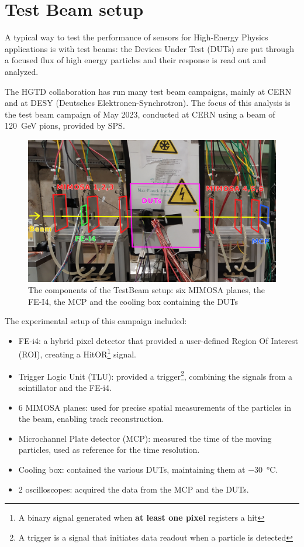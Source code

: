 \chapter{Test Beam setup}

A typical way to test the performance of sensors for High-Energy Physics applications is with test beams: the Devices Under Test (DUTs) are put through a focused flux of high energy particles and their response is read out and analyzed. %

The HGTD collaboration has run many test beam campaigns, mainly at CERN and at DESY (Deutsches Elektronen-Synchrotron). The focus of this analysis is the test beam campaign of May 2023, conducted at CERN using a beam of \qty{120}{\giga\electronvolt} pions, provided by SPS.

\begin{figure}[!ht]
    \centering
    \includegraphics[width=.95\linewidth]{Images/TestBeam_setup/TestBeam_setup_redrawn.png}
    \captionsetup{width=.8\linewidth}
    \caption{The components of the TestBeam setup: six MIMOSA planes, the FE-I4, the MCP and the cooling box containing the DUTs}
    \label{fig:testbeam_setup}
\end{figure}

The experimental setup of this campaign included:
\begin{itemize}
    \item FE-i4: a hybrid pixel detector that provided a user-defined Region Of Interest (ROI), creating a HitOR\footnote{A binary signal generated when \textbf{at least one pixel} registers a hit} signal. %
    \item Trigger Logic Unit (TLU): provided a trigger\footnote{A trigger is a signal that initiates data readout when a particle is detected}, combining the signals from a scintillator and the FE-i4. %
    \item 6 MIMOSA planes: used for precise spatial measurements of the particles in the beam, enabling track reconstruction.
    \item Microchannel Plate detector (MCP): measured the time of the moving particles, used as reference for the time resolution.
    \item Cooling box: contained the various DUTs, maintaining them at \qty{-30}{\degreeCelsius}.
    \item 2 oscilloscopes: acquired the data from the MCP and the DUTs. %
\end{itemize}

